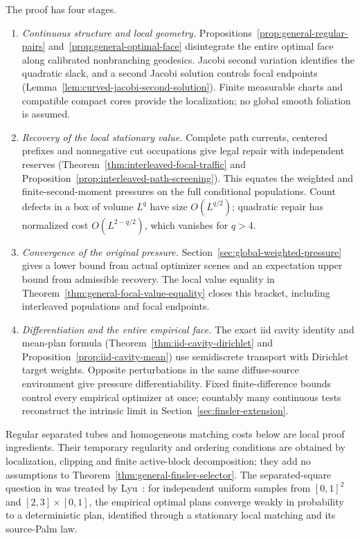 \documentclass[11pt,reqno]{amsart}
\theoremstyle{definition}
\theoremstyle{remark}
\numberwithin{equation}{section}
\begin{document}
The proof has four stages.
\begin{enumerate}[label=\textup{(\roman*)},leftmargin=*]
\item \emph{Continuous structure and local geometry.}
Propositions~\ref{prop:general-regular-pairs}
and~\ref{prop:general-optimal-face} disintegrate the entire optimal
face along calibrated nonbranching geodesics. Jacobi second variation
identifies the quadratic slack, and a second Jacobi solution controls
focal endpoints (Lemma~\ref{lem:curved-jacobi-second-solution}).
Finite measurable charts and compatible compact cores provide the
localization; no global smooth foliation is assumed.

\item \emph{Recovery of the local stationary value.}
Complete path currents, centered prefixes and nonnegative cut
occupations give legal repair with independent reserves
(Theorem~\ref{thm:interleaved-focal-traffic} and
Proposition~\ref{prop:interleaved-path-screening}). This equates the
weighted and finite-second-moment pressures on the full conditional
populations. Count defects in a box of volume \(L^q\) have size
\(O(L^{q/2})\); quadratic repair has normalized cost
\(O(L^{2-q/2})\), which vanishes for \(q>4\).

\item \emph{Convergence of the original pressure.}
Section~\ref{sec:global-weighted-pressure} gives a lower bound from
actual optimizer scenes and an expectation upper bound from admissible
recovery. The local value equality in
Theorem~\ref{thm:general-focal-value-equality} closes this bracket,
including interleaved populations and focal endpoints.

\item \emph{Differentiation and the entire empirical face.}
The exact iid cavity identity and mean-plan formula
(Theorem~\ref{thm:iid-cavity-dirichlet} and
Proposition~\ref{prop:iid-cavity-mean}) use semidiscrete transport
with Dirichlet target weights. Opposite perturbations in the same
diffuse-source environment give pressure differentiability. Fixed
finite-difference bounds control every empirical optimizer at once;
countably many continuous tests reconstruct the intrinsic limit in
Section~\ref{sec:finsler-extension}.
\end{enumerate}

Regular separated tubes and homogeneous matching costs below are local
proof ingredients. Their temporary regularity and ordering conditions
are obtained by localization, clipping and finite active-block
decomposition; they add no assumptions to
Theorem~\ref{thm:general-finsler-selector}.
The separated-square question in \cite[Section~7, Problem~4]{delBarrioEtAl2025}
was treated by Lyu~\cite{Lyu2026EmpiricalW1}: for independent uniform
samples from \([0,1]^2\) and \([2,3]\times[0,1]\), the empirical
optimal plans converge weakly in probability to a deterministic plan,
identified through a stationary local matching and its source-Palm law.
\end{document}
